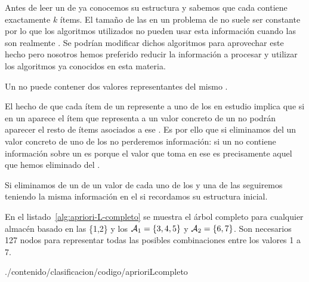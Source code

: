 \ABIERTO
Antes de leer un \dataset de \registros ya conocemos su estructura y sabemos que cada \registro contiene exactamente $k$ ítems. El tamaño de las \transacciones en un problema de \ARM no suele ser constante por lo que los algoritmos utilizados no pueden usar esta información cuando las \transacciones son realmente \registros. Se podrían modificar dichos algoritmos para aprovechar este hecho pero nosotros hemos preferido reducir la información a procesar y utilizar los algoritmos ya conocidos en esta materia.

\begin{Lemma}
   Un \registro no puede contener dos valores representantes del mismo \atributo.
\label{lema:un-valor-por-atributo}
\end{Lemma}

El hecho de que cada ítem de un \registro represente a uno de los \atributos en estudio implica que si en un \registro aparece el ítem que representa a un valor concreto de un \atributo no podrán aparecer el resto de ítems asociados a ese \atributo. Es por ello que si eliminamos del \dataset un valor concreto de uno de los \atributos no perderemos información: si un \registro no contiene información sobre un \atributo es porque el valor que toma en ese \atributo es precisamente aquel que hemos eliminado del \dataset.

\begin{Lemma}
   Si eliminamos de un \dataset de \registros un valor de cada uno de los \atributos y una de las \clases seguiremos teniendo la misma información en el \dataset si recordamos su estructura inicial.
\label{lema:eliminar-valores}
\end{Lemma}

En el listado~\ref{alg:apriori-L-completo} se muestra el árbol \aprioriL completo para cualquier almacén \D basado en las \clases \{1,2\} y los \atributos $\A_1=\{3,4,5\}$ y $\A_2=\{6,7\}$. Son necesarios 127 nodos para representar todas las posibles combinaciones entre los valores 1 a 7.


                 {./contenido/clasificacion/codigo/aprioriLcompleto}


